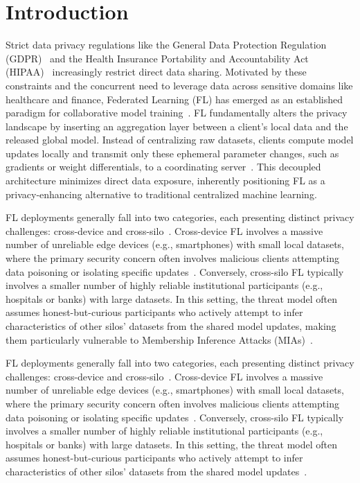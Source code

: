 \documentclass[bdcc,article,submit,pdftex]{Definitions/mdpi}
\begin{document}
\section{Introduction}

Strict data privacy regulations like the General Data Protection Regulation (GDPR)~\cite{gdpr} and the Health Insurance Portability and Accountability Act (HIPAA)~\cite{hipaa} increasingly restrict direct data sharing. Motivated by these constraints and the concurrent need to leverage data across sensitive domains like healthcare and finance, Federated Learning (FL) has emerged as an established paradigm for collaborative model training~\cite{mcmahan2017communication,kairouz2021advances}. FL fundamentally alters the privacy landscape by inserting an aggregation layer between a client's local data and the released global model. Instead of centralizing raw datasets, clients compute model updates locally and transmit only these ephemeral parameter changes, such as gradients or weight differentials, to a coordinating server~\cite{mothukuri2021survey,yin2021comprehensive}. This decoupled architecture minimizes direct data exposure, inherently positioning FL as a privacy-enhancing alternative to traditional centralized machine learning.

FL deployments generally fall into two categories, each presenting distinct privacy challenges: cross-device and cross-silo~\cite{kairouz2021advances}. Cross-device FL involves a massive number of unreliable edge devices (e.g., smartphones) with small local datasets, where the primary security concern often involves malicious clients attempting data poisoning or isolating specific updates~\cite{mothukuri2021survey}. Conversely, cross-silo FL typically involves a smaller number of highly reliable institutional participants (e.g., hospitals or banks) with large datasets. In this setting, the threat model often assumes honest-but-curious participants who actively attempt to infer characteristics of other silos' datasets from the shared model updates, making them particularly vulnerable to Membership Inference Attacks (MIAs)~\cite{yin2021comprehensive}.

FL deployments generally fall into two categories, each presenting distinct privacy challenges: cross-device and cross-silo~\cite{kairouz2021advances}. Cross-device FL involves a massive number of unreliable edge devices (e.g., smartphones) with small local datasets, where the primary security concern often involves malicious clients attempting data poisoning or isolating specific updates~\cite{mothukuri2021survey}. Conversely, cross-silo FL typically involves a smaller number of highly reliable institutional participants (e.g., hospitals or banks) with large datasets. In this setting, the threat model often assumes honest-but-curious participants who actively attempt to infer characteristics of other silos' datasets from the shared model updates~\cite{yin2021comprehensive}.
\end{document}
